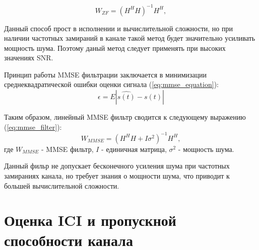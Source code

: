 \begin{equation}
    W_{ZF} = (H^H H)^{-1} H^H,
    \label{eq:zf_filer}
\end{equation}

Данный способ прост в исполнении и вычислительной сложности, но при наличии частотных замираний в канале
такой метод будет значительно усиливать мощность шума. Поэтому даный метод следует применять при высоких значениях SNR.

Принцип работы MMSE фильтрации заключается в минимизации среднеквадратической ошибки оценки сигнала (\ref{eq:mmse_equation}):
\begin{equation}
    \epsilon = E{|\hat{s(t)} - s(t)|}
    \label{eq:mmse_equation}
\end{equation}

\noindent Таким образом, линейный MMSE фильтр сводится к следующему выражению (\ref{eq:mmse_filter}):
\begin{equation}
    W_{MMSE} = (H^H H + I \sigma^2)^{-1} H^H,
    \label{eq:mmse_filter}
\end{equation}
где $W_{MMSE}$ - MMSE фильтр, $I$ - единичная матрица, $\sigma^2$ - мощность шума.

Данный фильр не допускает бесконечного усиления шума при частотных замираниях канала,
но требует знания о мощности шума, что приводит к большей вычислительной сложности.



\section{Оценка ICI и пропускной способности канала}

